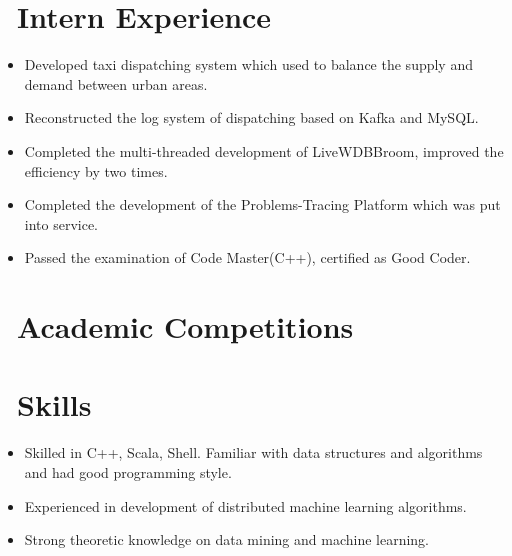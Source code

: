 \documentclass{resume}
\begin{document}
\section{\faSitemap\ Intern Experience}

\begin{itemize}
  \item Developed taxi dispatching system which used to balance the supply and demand between urban areas.
  \item Reconstructed the log system of dispatching based on Kafka and MySQL.
\end{itemize}

\begin{itemize}
  \item Completed the multi-threaded development of LiveWDBBroom, improved the efficiency by two times.
  \item Completed the development of the Problems-Tracing Platform which was put into service.
  \item Passed the examination of Code Master(C++), certified as Good Coder.
\end{itemize}

\section{\faTrophy\ Academic Competitions}

\section{\faCogs\ Skills}
\begin{itemize}[parsep=0.5ex]
  \item Skilled in C++, Scala, Shell. Familiar with data structures and algorithms and had good programming style.
  \item Experienced in development of distributed machine learning algorithms.
  \item Strong theoretic knowledge on data mining and machine learning.
\end{itemize}



\pagebreak
\end{document}
